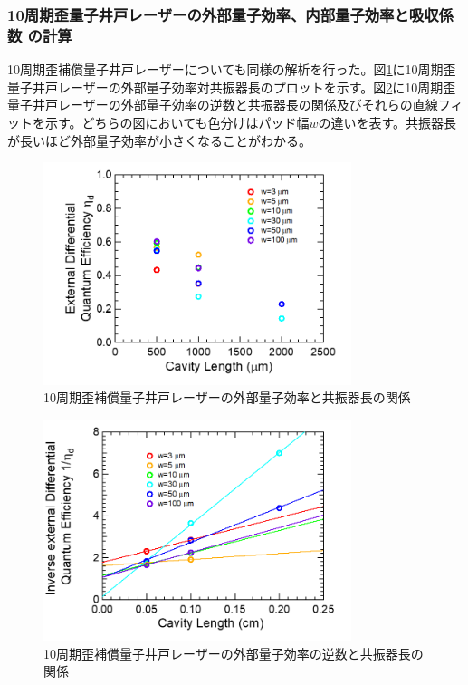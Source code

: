 {{\subsubsection{10周期歪量子井戸レーザーの外部量子効率、内部量子効率と吸収係数
の計算}
10周期歪補償量子井戸レーザーについても同様の解析を行った。図\ref{fig:fig_3_1_10QW_broadcontact_id_02}に10周期歪量子井戸レーザーの外部量子効率対共振器長のプロットを示す。図\ref{fig:fig_3_1_10QW_broadcontact_id_inverse_02}に10周期歪量子井戸レーザーの外部量子効率の逆数と共振器長の関係及びそれらの直線フィットを示す。どちらの図においても色分けはパッド幅$w$の違いを表す。共振器長が長いほど外部量子効率が小さくなることがわかる。
\begin{figure}[h]
	\centering
	\includegraphics[width=9cm]{figure/fig_3_1_10QW_broadcontact_id_02.png}
	\caption{10周期歪補償量子井戸レーザーの外部量子効率と共振器長の関係}
	\label{fig:fig_3_1_10QW_broadcontact_id_02}
\end{figure}

\begin{figure}[h]
	\centering
	\includegraphics[width=9cm]{figure/fig_3_1_10QW_broadcontact_id_inverse_02.png}
	\caption{10周期歪補償量子井戸レーザーの外部量子効率の逆数と共振器長の関係}
	\label{fig:fig_3_1_10QW_broadcontact_id_inverse_02}
\end{figure}

}}
